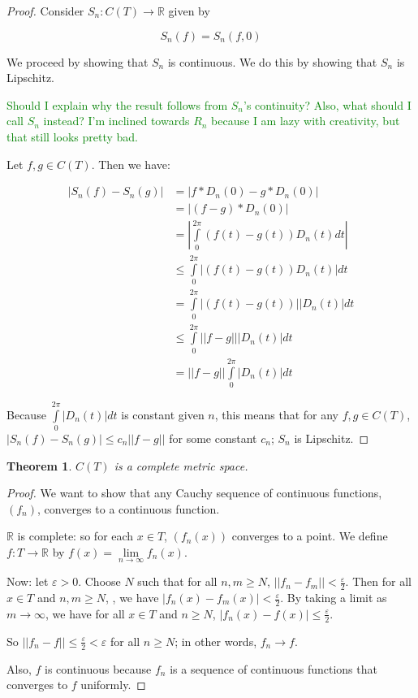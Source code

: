 \documentclass{amsart}
\newcommand{\vep}{\varepsilon}
\newcommand{\R}{\mathbb{R}}
\newtheorem{thm}{Theorem}[section]
\theoremstyle{definition}
\begin{document}
\begin{proof}
Consider $S_n: C(T) \to \R$ given by

\begin{displaymath}
S_n(f) = S_n(f,0)
\end{displaymath}

We proceed by showing that $S_n$ is continuous. 
We do this by showing that $S_n$ is Lipschitz.

\textcolor{green}{Should I explain why the result follows from $S_n$'s continuity? Also, what should I call $S_n$ instead? I'm inclined towards $R_n$ because I am lazy with creativity, but that still looks pretty bad.}

Let $f, g \in C(T)$. Then we have:

\begin{align*}
|S_n(f) - S_n(g)| &= |f \ast D_n(0) - g \ast D_n(0)| \\
&= |(f-g) \ast D_n(0)| \\
&= |\int\limits_0^{2\pi} (f(t)-g(t))D_n(t)dt| \\
&\leq \int\limits_0^{2\pi} |(f(t)-g(t))D_n(t)|dt \\
&= \int\limits_0^{2\pi} |(f(t)-g(t))||D_n(t)|dt \\
&\leq \int\limits_0^{2\pi} ||f-g|||D_n(t)|dt \\
&= ||f-g|| \int\limits_0^{2\pi} |D_n(t)|dt
\end{align*}

Because $\int\limits_0^{2\pi} |D_n(t)|dt$ is constant given $n$, this means that for any $f,g \in C(T)$, $|S_n(f) - S_n(g)| \leq c_n ||f-g||$ for some constant $c_n$; $S_n$ is Lipschitz.

\end{proof}

\begin{thm}
$C(T)$ is a complete metric space.
\end{thm}

\begin{proof}
We want to show that any Cauchy sequence of continuous functions, $(f_n)$, converges to a continuous function.

$\R$ is complete: so for each $x \in T$, $(f_n(x))$ converges to a point. We define $f: T \to \R$ by $f(x) = \lim\limits_{n \to \infty} f_n(x)$.

Now: let $\vep >0$. Choose $N$ such that for all $n,m \geq N$, $||f_n-f_m|| < \frac{\vep}{2}$. 
Then for all $x \in T$ and $n,m \geq N$, , we have $|f_n(x) - f_m(x)| < \frac{\vep}{2}$.
By taking a limit as $m \to \infty$, we have for all $x \in T$ and $n \geq N$, $|f_n(x) - f(x)| \leq \frac{\vep}{2}$.

So $||f_n - f|| \leq \frac{\vep}{2} < \vep$ for all $n \geq N$; in other words, $f_n \to f$.

Also, $f$ is continuous because $f_n$ is a sequence of continuous functions that converges to $f$ uniformly.

\end{proof}
\end{document}
